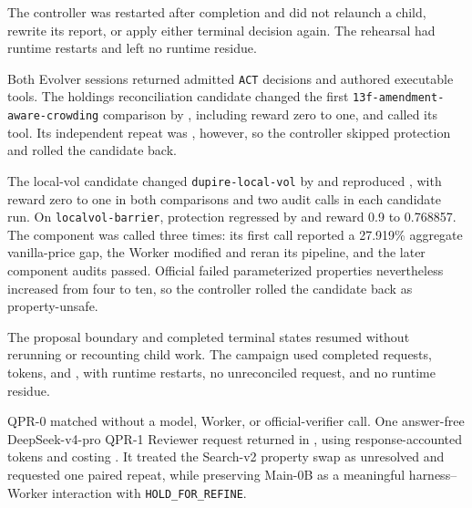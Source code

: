 The controller was restarted after completion and did not relaunch a child,
rewrite its report, or apply either terminal decision again. The rehearsal had
\ThinMainZeroRestarts{} runtime restarts and left no runtime residue.

 Both
Evolver sessions returned admitted \texttt{ACT} decisions and authored
executable tools. The holdings reconciliation candidate changed the first
\texttt{13f-amendment-aware-crowding} comparison by
\MainZeroBHoldingsTarget{}, including reward zero to one, and called its tool.
Its independent repeat was \MainZeroBHoldingsRepeat{}, however, so the
controller skipped protection and rolled the candidate back.

The local-vol candidate changed \texttt{dupire-local-vol} by
\MainZeroBLocalTarget{} and reproduced \MainZeroBLocalRepeat{}, with reward
zero to one in both comparisons and two audit calls in each candidate run. On
\texttt{localvol-barrier}, protection regressed by
\MainZeroBLocalProtection{} and reward 0.9 to 0.768857. The component was
called three times: its first call reported a 27.919\% aggregate
vanilla-price gap, the Worker modified and reran its pipeline, and the later
component audits passed. Official failed parameterized properties nevertheless
increased from four to ten, so the controller rolled the candidate back as
property-unsafe.

The proposal boundary and completed terminal states resumed without rerunning
or recounting child work. The campaign used \MainZeroBRequests{} completed
requests, \MainZeroBTokens{} tokens, and \MainZeroBCost{}, with
\MainZeroBRestarts{} runtime restarts, no unreconciled request, and no runtime
residue. 

 QPR-0
matched \QPRZeroStatus{} without a model, Worker, or official-verifier call.
One answer-free DeepSeek-v4-pro QPR-1 Reviewer request returned
\QPROneStatus{} in \QPROneWall{}, using \QPROneTokens{} response-accounted
tokens and costing \QPROneCost{}. It treated the Search-v2 property swap as
unresolved and requested one paired repeat, while preserving Main-0B as a
meaningful harness--Worker interaction with \texttt{HOLD\_FOR\_REFINE}.

